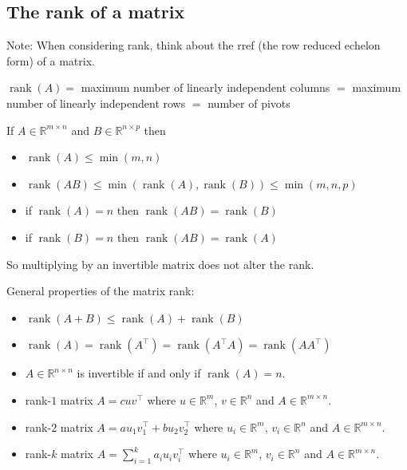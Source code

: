 \documentclass[14pt]{article}
\theoremstyle{definition}
\theoremstyle{remark}
\begin{document}
\headrule

\begin{multicols}{2}
    \section{The rank of a matrix}

    Note: When considering rank, think about the rref (the row reduced echelon form) of a matrix.

    $\operatorname{rank}(A)=$ maximum number of linearly independent columns $=$ maximum number of linearly independent rows $=$ number of pivots

    If $A \in \mathbb{R}^{m \times n}$ and $B \in \mathbb{R}^{n \times p}$ then

    \begin{itemize}
        \item $\operatorname{rank}(A) \leq \min (m, n)$

        \item $\operatorname{rank}(A B) \leq \min (\operatorname{rank}(A), \operatorname{rank}(B)) \leq \min (m, n, p)$

        \item if $\operatorname{rank}(A)=n$ then $\operatorname{rank}(A B)=\operatorname{rank}(B)$

        \item if $\operatorname{rank}(B)=n$ then $\operatorname{rank}(A B)=\operatorname{rank}(A)$

    \end{itemize}

    So multiplying by an invertible matrix does not alter the rank.

    General properties of the matrix rank:

    \begin{itemize}
        \item $\operatorname{rank}(A+B) \leq \operatorname{rank}(A)+\operatorname{rank}(B)$

        \item $\operatorname{rank}(A)=\operatorname{rank}\left(A^{\top}\right)=\operatorname{rank}\left(A^{\top} A\right)=\operatorname{rank}\left(A A^{\top}\right)$

        \item $A \in \mathbb{R}^{n \times n}$ is invertible if and only if $\operatorname{rank}(A)=n$.
        \item rank-$1$ matrix $A = cuv^\top$ where $u\in\mathbb{R}^m$, $v\in\mathbb{R}^n$ and $A\in\mathbb{R}^{m\times n}$.
        \item rank-$2$ matrix $A = au_1v_1^\top + bu_2v_2^\top$ where $u_i\in\mathbb{R}^m$, $v_i\in\mathbb{R}^n$ and $A\in\mathbb{R}^{m\times n}$.
        \item rank-$k$ matrix $A = \sum_{i=1}^k a_iu_iv_i^\top$ where $u_i\in\mathbb{R}^m$, $v_i\in\mathbb{R}^n$ and $A\in\mathbb{R}^{m\times n}$.
    \end{itemize}


\end{multicols}
\end{document}
